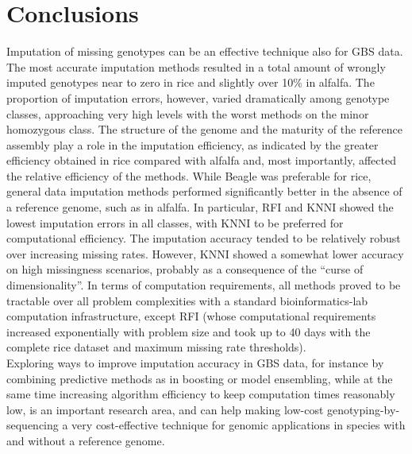 \section{Conclusions}
\label{sec:conclusions}
Imputation of missing genotypes can be an effective technique also for GBS data.
The most accurate imputation methods resulted in a total amount of wrongly imputed genotypes near to zero in rice and slightly over 10\% in alfalfa. 
The proportion of imputation errors, however, varied dramatically among genotype classes, approaching very high levels with the worst methods on the minor homozygous class.
The structure of the genome and the maturity of the reference assembly play a role in the imputation efficiency, as indicated by the greater efficiency obtained in rice compared with alfalfa and, most importantly, affected the relative efficiency of the methods. While Beagle was preferable for rice, general data imputation methods performed significantly better in the absence of a reference genome, such as in alfalfa. In particular, RFI and KNNI showed the lowest imputation errors in all classes, with KNNI to be preferred for computational efficiency.
The imputation accuracy tended to be relatively robust over increasing missing rates. However, KNNI showed a somewhat lower accuracy on high missingness scenarios, probably as a consequence of the ``curse of dimensionality''. In terms of computation requirements, all methods proved to be tractable over all problem complexities with a standard bioinformatics-lab computation infrastructure, except RFI (whose computational requirements increased exponentially with problem size and took up to 40 days with the complete rice dataset and maximum missing rate thresholds).\\
Exploring ways to improve imputation accuracy in GBS data, for instance by combining predictive methods as in boosting or model ensembling, while at the same time increasing algorithm efficiency to keep computation times reasonably low, is an important research area, and can help making low-cost genotyping-by-sequencing a very cost-effective technique for genomic applications in species with and without a reference genome.

